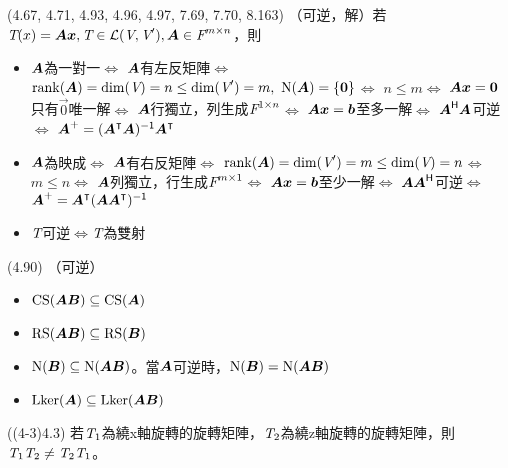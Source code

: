 \item \begin{theorem}{(4.67, 4.71, 4.93, 4.96, 4.97, 7.69, 7.70, 8.163)} （可逆，解）若$\T(x) = \mat{A}\vec{x}, \T \in \L(\V, \V'), \mat{A} \in \F^{m \times n}$，則
	\begin{itemize}
		\item $\mat{A}$為一對一$\iff$
		$\mat{A}$有左反矩陣$\iff$
		$\rnk(\mat{A}) = \dim(\V) = n \le \dim(\V') = m, \ \Ker(\mat{A}) = \{\vec{0}\}$$\iff$
		$n \le m$$\iff$
		$\mat{A}\vec{x} = \vec{0}$只有$\vec{0}$唯一解$\iff$
		$\mat{A}$行獨立，列生成$\F^{1 \times n}$$\iff$
		$\mat{A}\vec{x} = \vec{b}$至多一解$\iff$
		$\mat{A}\herm \mat{A}$可逆$\iff$
		$\mat{A}^+ = (\mat{A}^\intercal\mat{A})\inv\mat{A}^\intercal$
		\item $\mat{A}$為映成$\iff$
		$\mat{A}$有右反矩陣$\iff$
		$\rnk(\mat{A}) = \dim(\V') = m \le \dim(\V) = n$$\iff$
		$m \le n$$\iff$
		$\mat{A}$列獨立，行生成$\F^{m \times 1}$$\iff$
		$\mat{A}\vec{x} = \vec{b}$至少一解$\iff$
		$\mat{A}\mat{A}\herm$可逆$\iff$
		$\mat{A}^+ = \mat{A}^\intercal(\mat{A}\mat{A}^\intercal)\inv$
		\item $\T$可逆$\iff$$\T$為雙射
	\end{itemize}
\end{theorem}

\item \begin{theorem}{(4.90)} （可逆）
	\begin{itemize}
		\item $\cs(\mat{AB}) \subseteq \cs(\mat{A})$
		\item $\rs(\mat{AB}) \subseteq \rs(\mat{B})$
		\item $\Ker(\mat{B}) \subseteq \Ker(\mat{AB})$。當$\mat{A}$可逆時，$\Ker(\mat{B}) = \Ker(\mat{AB})$
		\item $\lker(\mat{A}) \subseteq \lker(\mat{AB})$
	\end{itemize}
\end{theorem}

\item \begin{theorem}{((4-3)4.3)} 
	若$\T_1$為繞x軸旋轉的旋轉矩陣，$\T_2$為繞z軸旋轉的旋轉矩陣，則$\T_1\T_2 \neq \T_2\T_1$。
\end{theorem}
